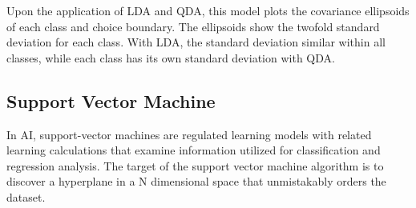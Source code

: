 \documentclass[a4paper,12pt]{report}
\begin{document}
Upon the application of LDA and QDA, this model plots the covariance ellipsoids of each class and choice boundary. The ellipsoids show the twofold standard deviation for each class. With LDA, the standard deviation similar within all classes, while each class has its own standard deviation with QDA.

\subsection{Support Vector Machine}
 
In AI, support-vector machines are regulated learning models with related learning calculations that examine information utilized for classification and regression analysis. The target of the support vector machine algorithm is to discover a hyperplane in a N dimensional space that unmistakably orders the dataset.
\end{document}
